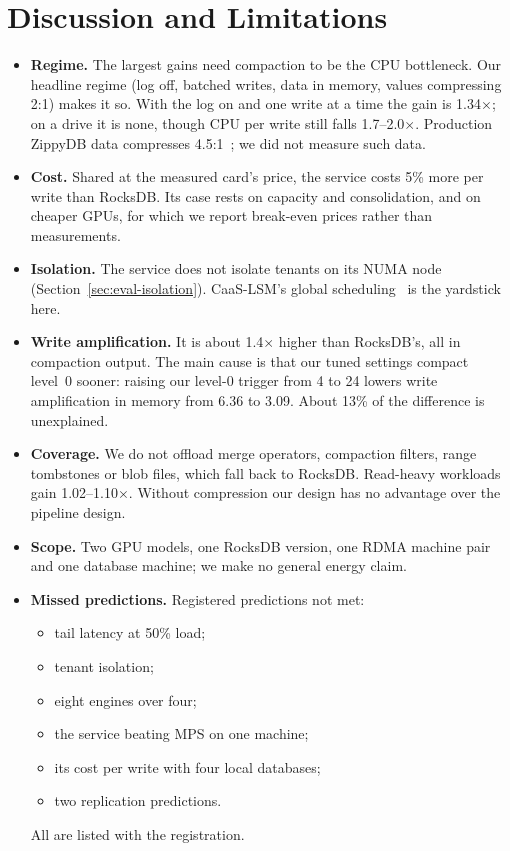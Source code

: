 \documentclass[sigconf, nonacm]{acmart}
\begin{document}
\section{Discussion and Limitations}
\label{sec:limits}
\begin{itemize}
  \item \textbf{Regime.} The largest gains need compaction to be the CPU bottleneck. Our
        headline regime (log off, batched writes, data in memory, values compressing 2:1)
        makes it so. With the log on and one write at a time the gain is 1.34$\times$; on a
        drive it is none, though CPU per write still falls 1.7--2.0$\times$. Production
        ZippyDB data compresses 4.5:1~\cite{cao2020}; we did not measure such data.
  \item \textbf{Cost.} Shared at the measured card's price, the service costs 5\% more per
        write than RocksDB. Its case rests on capacity and consolidation, and on cheaper
        GPUs, for which we report break-even prices rather than measurements.
  \item \textbf{Isolation.} The service does not isolate tenants on its NUMA node
        (Section~\ref{sec:eval-isolation}). CaaS-LSM's global scheduling~\cite{caaslsm2024} is
        the yardstick here.
  \item \textbf{Write amplification.} It is about 1.4$\times$ higher than RocksDB's, all in
        compaction output. The main cause is that our tuned settings compact level~0 sooner:
        raising our level-0 trigger from 4 to 24 lowers write amplification in memory from 6.36
        to 3.09. About 13\% of the difference is unexplained.
  \item \textbf{Coverage.} We do not offload merge operators, compaction filters, range
        tombstones or blob files, which fall back to RocksDB. Read-heavy workloads gain
        1.02--1.10$\times$. Without compression our design has no advantage over the pipeline
        design.
  \item \textbf{Scope.} Two GPU models, one RocksDB version, one RDMA machine pair and one
        database machine; we make no general energy claim.
  \item \textbf{Missed predictions.} Registered predictions not met:
        \begin{itemize}
          \item tail latency at 50\% load;
          \item tenant isolation;
          \item eight engines over four;
          \item the service beating MPS on one machine;
          \item its cost per write with four local databases;
          \item two replication predictions.
        \end{itemize}
        All are listed with the registration.
\end{itemize}
\end{document}

